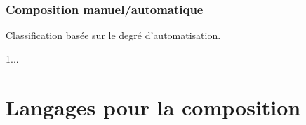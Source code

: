       \subsubsection{Composition manuel/automatique}
      \label{sec:comp-manu}
      Classification basée sur le degré d’automatisation.

      
      
      

      \ref{sec:lang-de-comp}...

      


  \section{Langages pour la composition}
  \label{sec:lang-de-comp}

